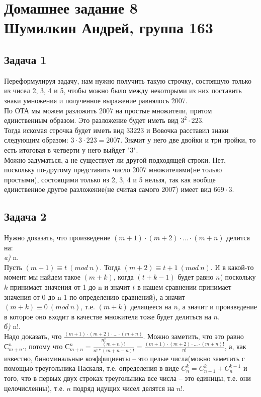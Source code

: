 

	\section{Домашнее задание 8\\ Шумилкин Андрей, группа 163} 
	\subsection{Задача 1} 
	Переформулируя задачу, нам нужно получить такую строчку, состоящую только из чисел 2, 3, 4 и 5, чтобы можно было между некоторыми из них поставить знаки умножения и полученное выражение равнялось 2007.\\
	По ОТА мы можем разложить 2007 на простые множители, притом единственным образом. Это разложение будет иметь вид $3^2 \cdot 223$.\\
	Тогда искомая строчка будет иметь вид $33223$ и Вовочка расставил знаки следующим образом: $3 \cdot 3 \cdot 223 =2007$. Значит у него две двойки и три тройки, то есть итоговая в четверти у него выйдет "3".\\
	Можно задуматься, а не существует ли другой подходящей строки. Нет, поскольку по-другому  представить число 2007 множителями(не только простыми), состоящими только из 2, 3, 4 и 5 нельзя, так как вообще единственное другое разложение(не считая самого 2007) имеет вид $669 \cdot 3$.
	\subsection{Задача 2} 
	Нужно доказать, что произведение $(m + 1) \cdot (m + 2) \cdot \ldots \cdot (m + n)$ делится на:\\
	\textit{a)} n. \\
	Пусть $(m + 1) \equiv t\ (mod\ n).$ Тогда $(m + 2) \equiv t + 1\ (mod\ n).$
	И в какой-то момент мы найдем такое $(m + k)$, когда $(t + k - 1)$ будет равно $n$( поскольку $k$ принимает значения от 1 до n и значит $t$ в нашем сравнении принимает значения от 0 до n-1 по определению сравнений), а значит $(m + k) \equiv 0\ (mod\ n)$, т.е. $(m + k)$ делящееся на $n$, а значит и произведение в которое оно входит в качестве множителя тоже будет делиться на $n$.\\
	\textit{б)} n!. \\
	Надо доказать, что $\frac{(m+1) \cdot (m+2) \cdot \ldots \cdot(m+n)}{n!}$. Можно заметить, что это равно $С_{m + n}^{n}.$, потому что $С_{m + n}^{n} = \frac{(m+n)!}{n!*(m + n - n)!} = \frac{(m+1) \cdot (m+2) \cdot \ldots \cdot(m+n)!}{n!}$, а, как известно, биноминальные коэффициенты -- это целые числа(можно заметить с помощью треугольника Паскаля, т.е. определения в виде $C_{n}^{k} = C_{n-1}^{k} + C_{n}^{k - 1}$ и того, что в первых двух строках треугольника все числа -- это единицы, т.е. они целочисленны), т.е. $n$ подряд идущих чисел делятся на $n!$.  
	
